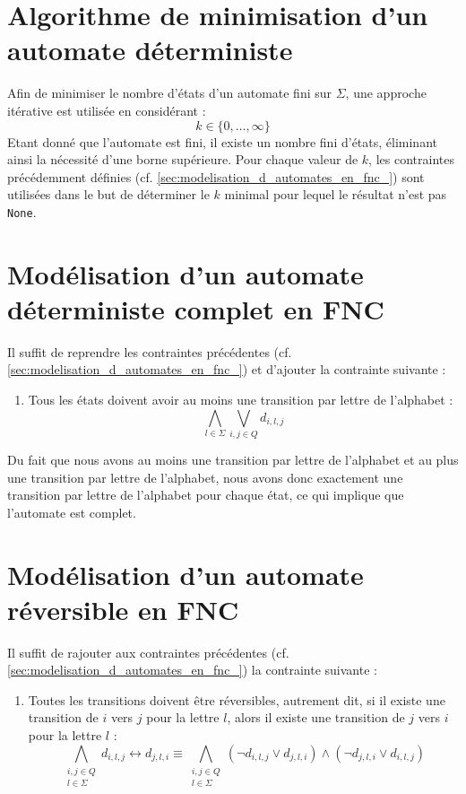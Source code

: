 \documentclass[a4paper, 12pt]{extarticle}
\begin{document}
\section{Algorithme de minimisation d'un automate déterministe}
\label{sec:algo_minimisation}
\noindent Afin de minimiser le nombre d'états d'un automate fini sur $\Sigma$, une approche itérative est utilisée en considérant :
\begin{equation*}
    k\in\{0,\dots,\infty\}
\end{equation*}
Etant donné que l'automate est fini, il existe un nombre fini d'états, éliminant ainsi la nécessité d'une borne supérieure.
Pour chaque valeur de $k$, les contraintes précédemment définies (cf. \ref{sec:modelisation_d_automates_en_fnc_}) sont utilisées
dans le but de déterminer le $k$ minimal pour lequel le résultat n'est pas \texttt{None}.


\section{Modélisation d'un automate déterministe complet en FNC} 
\label{sec:automate_deterministe_complet}
\noindent Il suffit de reprendre les contraintes précédentes (cf. \ref{sec:modelisation_d_automates_en_fnc_}) et d'ajouter la
contrainte suivante :
\begin{enumerate}
    \item Tous les états doivent avoir au moins une transition par lettre de l'alphabet :
    \begin{equation*}
        \bigwedge_{l \in \Sigma} \bigvee_{i,j\in Q} d_{i,l,j}
    \end{equation*}
\end{enumerate}
Du fait que nous avons au moins une transition par lettre de l'alphabet et au plus une transition par lettre de l'alphabet,
nous avons donc exactement une transition par lettre de l'alphabet pour chaque état, ce qui implique que l'automate est complet.


\section{Modélisation d'un automate réversible en FNC}
\noindent Il suffit de rajouter aux contraintes précédentes (cf. \ref{sec:modelisation_d_automates_en_fnc_}) la contrainte suivante :
\begin{enumerate}
    \item Toutes les transitions doivent être réversibles, autrement dit, si il existe une transition de $i$ vers $j$ pour la lettre $l$,
    alors il existe une transition de $j$ vers $i$ pour la lettre $l$ :
    \begin{equation*}
        \bigwedge_{\substack{i,j \in Q\\l \in \Sigma}} d_{i,l,j} \leftrightarrow d_{j,l,i}\equiv
        \bigwedge_{\substack{i,j \in Q\\l \in \Sigma}} (\neg d_{i,l,j} \vee d_{j,l,i}) \wedge (\neg d_{j,l,i} \vee d_{i,l,j})
    \end{equation*}
\end{enumerate}
\end{document}
